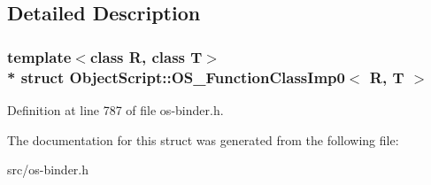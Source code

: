 \subsection{Detailed Description}
\subsubsection*{template$<$class R, class T$>$\\*
struct Object\+Script\+::\+O\+S\+\_\+\+Function\+Class\+Imp0$<$ R, T $>$}



Definition at line 787 of file os-\/binder.\+h.



The documentation for this struct was generated from the following file\+:\begin{DoxyCompactItemize}
\item 
src/os-\/binder.\+h\end{DoxyCompactItemize}
